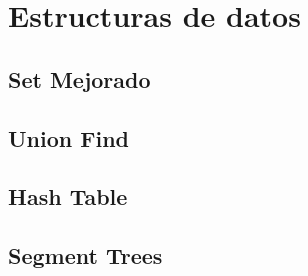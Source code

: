 \section{Estructuras de datos}

\subsection{Set Mejorado}


\subsection{Union Find}
% 
% 


\subsection{Hash Table}


\subsection{Segment Trees}
